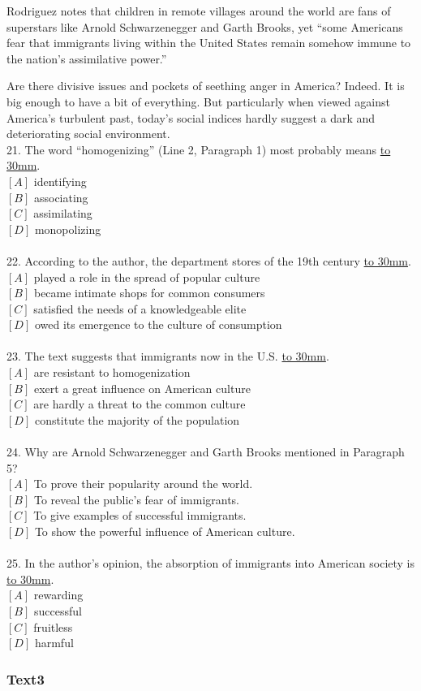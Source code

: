 \documentclass[a4paper]{article}
\begin{document}
\par
Rodriguez notes that children in remote villages around the world are fans of superstars like Arnold Schwarzenegger and Garth Brooks, yet “some Americans fear that immigrants living within the United States remain somehow immune to the nation’s assimilative power.”

\par
Are there divisive issues and pockets of seething anger in America? Indeed. It is big enough to have a bit of everything. But particularly when viewed against America’s turbulent past, today’s social indices hardly suggest a dark and deteriorating social environment.
\\21.	The word “homogenizing” (Line 2, Paragraph 1) most probably means \underline{\hbox to 30mm{}}.\\$[A]$ identifying\\$[B]$ associating\\$[C]$ assimilating\\$[D]$ monopolizing\\\\22.	According to the author, the department stores of the 19th century \underline{\hbox to 30mm{}}.\\$[A]$ played a role in the spread of popular culture\\$[B]$ became intimate shops for common consumers\\$[C]$ satisfied the needs of a knowledgeable elite\\$[D]$ owed its emergence to the culture of consumption\\\\23.	The text suggests that immigrants now in the U.S. \underline{\hbox to 30mm{}}.\\$[A]$ are resistant to homogenization\\$[B]$ exert a great influence on American culture\\$[C]$ are hardly a threat to the common culture\\$[D]$ constitute the majority of the population\\\\24.	Why are Arnold Schwarzenegger and Garth Brooks mentioned in Paragraph 5?\\$[A]$ To prove their popularity around the world.\\$[B]$ To reveal the public’s fear of immigrants.\\$[C]$ To give examples of successful immigrants.\\$[D]$ To show the powerful influence of American culture.\\\\25.	In the author’s opinion, the absorption of immigrants into American society is \underline{\hbox to 30mm{}}.\\$[A]$ rewarding\\$[B]$ successful\\$[C]$ fruitless\\$[D]$ harmful\\\subsubsection{Text3}
\end{document}
